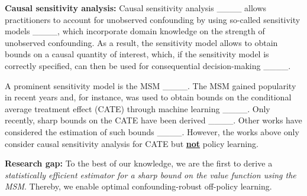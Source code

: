 

\textbf{Causal sensitivity analysis:} Causal sensitivity analysis ____ allows practitioners to account for unobserved confounding by using so-called sensitivity models ____, which incorporate domain knowledge on the strength of unobserved confounding. As a result, the sensitivity model allows to obtain bounds on a causal quantity of interest, which, if the sensitivity model is correctly specified, can then be used for consequential decision-making  ____. 

A prominent sensitivity model is the MSM ____. The MSM gained popularity in recent years and, for instance, was used to obtain bounds on the conditional average treatment effect (CATE) through machine learning ____. Only recently, sharp bounds on the CATE have been derived ____. Other works have considered the estimation of such bounds ____. However, the works above only consider causal sensitivity analysis for CATE but \textbf{\underline{not}} policy learning.

\textbf{Research gap:} To the best of our knowledge, we are the first to derive a \emph{statistically efficient estimator for a sharp bound on the value function using the MSM}. Thereby, we enable optimal confounding-robust off-policy learning.